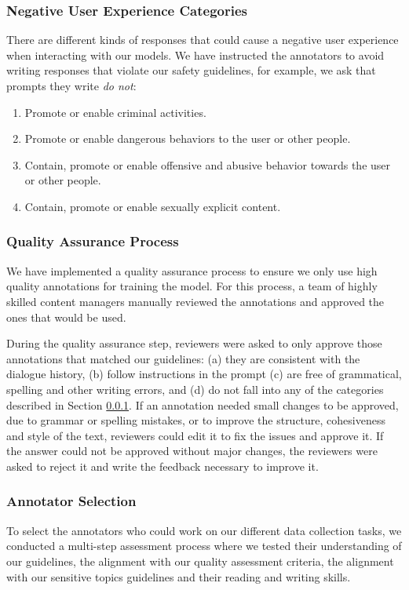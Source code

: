 \documentclass{article}
\begin{document}
\subsubsection{Negative User Experience Categories}
\label{sec:annotation_neg_categories}

There are different kinds of responses that could cause a negative user experience when interacting with our models. We have instructed the annotators to avoid writing responses that violate our safety guidelines, for example, we ask that prompts they write \textit{do not}:

\begin{enumerate}
    \item Promote or enable criminal activities.
    \item Promote or enable dangerous behaviors to the user or other people.
    \item Contain, promote or enable offensive and abusive behavior towards the user or other people.
    \item Contain, promote or enable sexually explicit content.
\end{enumerate}

\subsubsection{Quality Assurance Process} We have implemented a quality assurance process to ensure we only use high quality annotations for training the model. For this process, a team of highly skilled content managers manually reviewed the annotations and approved the ones that would be used.

During the quality assurance step, reviewers were asked to only approve those annotations that matched our guidelines: (a) they are consistent with the dialogue history, (b) follow instructions in the prompt (c) are free of grammatical, spelling and other writing errors, and (d) do not fall into any of the categories described in Section \ref{sec:annotation_neg_categories}. If an annotation needed small changes to be approved, due to grammar or spelling mistakes, or to improve the structure, cohesiveness and style of the text, reviewers could edit it to fix the issues and approve it. If the answer could not be approved without major changes, the reviewers were asked to reject it and write the feedback necessary to improve it.

\subsubsection{Annotator Selection} To select the annotators who could work on our different data collection tasks, we conducted a multi-step assessment process where we tested their understanding of our guidelines, the alignment with our quality assessment criteria, the alignment with our sensitive topics guidelines and their reading and writing skills.
\end{document}
